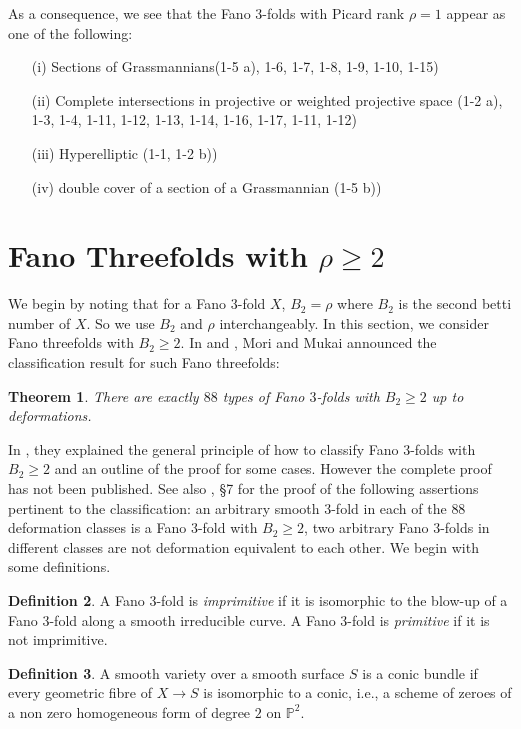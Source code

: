 \documentclass[11pt]{amsart}
\theoremstyle{plain}
\newtheorem{theorem}{Theorem}[section]
\theoremstyle{definition}
\newtheorem{definition}[theorem]{Definition}
\theoremstyle{expl}
\begin{document}
As a consequence, we see that the Fano $3$-folds with Picard rank $\rho =1$ appear as one of the following: 
\begin{enumerate}
    \item[(i)] Sections of Grassmannians(1-5 a), 1-6, 1-7, 1-8, 1-9, 1-10, 1-15)
    \item[(ii)] Complete intersections in projective or weighted projective space (1-2 a), 1-3, 1-4, 1-11, 1-12, 1-13, 1-14, 1-16, 1-17, 1-11, 1-12)
    \item[(iii)] Hyperelliptic (1-1, 1-2 b))
    \item[(iv)] double cover of a section of a Grassmannian (1-5 b))
\end{enumerate}

\section{Fano Threefolds with $\rho \geq 2$}
We begin by noting that for a Fano $3$-fold $X$, $B_2 =\rho$ where $B_2$ is the second betti number of $X$. So we use $B_2$ and $\rho$ interchangeably. 
In this section, we consider Fano threefolds with $B_2 \geq 2$. 
In \cite{MM81} and \cite{MM03}, Mori and Mukai announced the classification result for such Fano threefolds: 
	\begin{theorem}
	There are exactly $88$ types of Fano $3$-folds with $B_2 \geq 2$ up to deformations.
	\end{theorem}
In \cite{MM83}, they explained the general principle of how to classify Fano $3$-folds with $B_2 \geq 2$ and an outline of the proof for some cases. However the complete proof has not been published. See also \cite{MM85}, \S 7 for the proof of the following assertions pertinent to the classification:
an arbitrary smooth $3$-fold in each of the $88$ deformation classes is a Fano $3$-fold with $B_2 \geq 2$, two arbitrary Fano $3$-folds in different classes are not deformation equivalent to each other.
	We begin with some definitions. 
	\begin{definition}
		A Fano $3$-fold is \textit{imprimitive} if it is isomorphic to the blow-up of a Fano $3$-fold along a smooth irreducible curve. A Fano $3$-fold is \textit{primitive} if it is not imprimitive.
	\end{definition}
	\begin{definition}
	    A smooth variety over a smooth surface $S$ is a conic bundle if every geometric fibre of $X \to S$ is isomorphic to a conic, i.e., a scheme of zeroes of a non zero homogeneous form of degree $2$ on $\mathbb{P}^2$.
	\end{definition}
\end{document}
